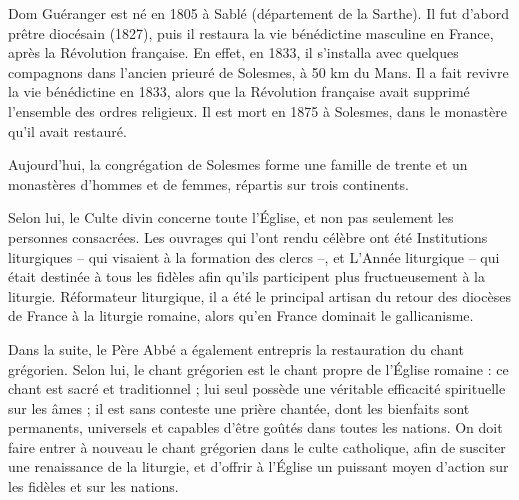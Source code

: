 \documentclass[Session2026.tex]{subfiles}
\begin{document}

\vspace*{2cm}

Dom Guéranger est né en 1805 à Sablé (département de la Sarthe). Il fut d’abord prêtre
diocésain (1827), puis il restaura la vie bénédictine masculine en France, après la
Révolution française. En effet, en 1833, il s’installa avec quelques compagnons dans
l’ancien prieuré de Solesmes, à 50 km du Mans. Il a fait revivre la vie bénédictine en 1833, alors
que la Révolution française avait supprimé l’ensemble des ordres religieux. Il est mort en
1875 à Solesmes, dans le monastère qu’il avait restauré.

\vspace{5mm}

Aujourd’hui, la congrégation de Solesmes forme une famille de trente et un monastères
d’hommes et de femmes, répartis sur trois continents.

\vspace{5mm}

Selon lui, le Culte divin concerne toute l’Église, et non pas seulement les personnes consacrées. Les ouvrages qui l’ont rendu célèbre ont
été Institutions liturgiques – qui visaient à la formation des clercs –, et L’Année liturgique – qui
était destinée à tous les fidèles afin qu’ils participent plus fructueusement à la liturgie.
Réformateur liturgique, il a été le principal artisan du retour des diocèses de France à la liturgie
romaine, alors qu’en France dominait le gallicanisme.

\vspace{5mm}

Dans la suite, le Père Abbé a également entrepris la restauration du chant grégorien. Selon lui, le
chant grégorien est le chant propre de l’Église romaine : ce chant est sacré et traditionnel ; lui seul
possède une véritable efficacité spirituelle sur les âmes ; il est sans conteste une prière chantée, dont
les bienfaits sont permanents, universels et capables d’être goûtés dans toutes les nations. On doit
faire entrer à nouveau le chant grégorien dans le culte catholique, afin de susciter une renaissance
de la liturgie, et d’offrir à l’Église un puissant moyen d’action sur les fidèles et sur les nations.

\vspace{5mm}
\end{document}
